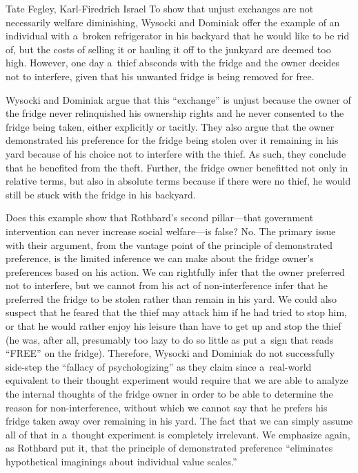 \begin{artengenv2auth}{Tate Fegley, Karl-Firedrich Israel}
To show that unjust exchanges are not necessarily welfare diminishing, Wysocki and Dominiak 
\parencite*[][]{wysocki_how_2023} %
 offer the example of an individual with a~broken refrigerator in his backyard that he would like to be rid of, but the costs of selling it or hauling it off to the junkyard are deemed too high. However, one day a~thief absconds with the fridge and the owner decides not to interfere, given that his unwanted fridge is being removed for free.



Wysocki and Dominiak argue that this ``exchange'' is unjust because the owner of the fridge never relinquished his ownership rights and he never consented to the fridge being taken, either explicitly or tacitly. They also argue that the owner demonstrated his preference for the fridge being stolen over it remaining in his yard because of his choice not to interfere with the thief. As such, they conclude that he benefited from the theft. Further, the fridge owner benefitted not only in relative terms, but also in absolute terms because if there were no thief, he would still be stuck with the fridge in his backyard.



Does this example show that Rothbard's second pillar---that government intervention can never increase social welfare---is false? No. The primary issue with their argument, from the vantage point of the principle of demonstrated preference, is the limited inference we can make about the fridge owner's preferences based on his action. We can rightfully infer that the owner preferred not to interfere, but we cannot from his act of non-interference infer that he preferred the fridge to be stolen rather than remain in his yard. We could also suspect that he feared that the thief may attack him if he had tried to stop him, or that he would rather enjoy his leisure than have to get up and stop the thief (he was, after all, presumably too lazy to do so little as put a~sign that reads ``FREE'' on the fridge). Therefore, Wysocki and Dominiak do not successfully side-step the ``fallacy of psychologizing'' as they claim since a~real-world equivalent to their thought experiment would require that we are able to analyze the internal thoughts of the fridge owner in order to be able to determine the reason for non-interference, without which we cannot say that he prefers his fridge taken away over remaining in his yard. The fact that we can simply assume all of that in a~thought experiment is completely irrelevant. We emphasize again, as Rothbard 
\parencite*[][p.320]{rothbard_toward_2011} %
 put it, that the principle of demonstrated preference ``eliminates hypothetical imaginings about individual value scales.''




\end{artengenv2auth}
